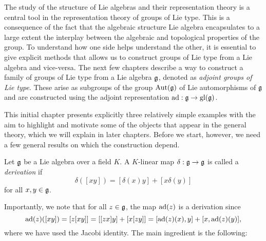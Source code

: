 The study of the structure of Lie algebras and their representation theory is a central tool in the representation theory of groups of Lie type. This is a consequence of the fact that the algebraic structure Lie algebra encapsulates to a large extent the interplay between the algebraic and topological properties of the group. To understand how one side helps understand the other, it is essential to give explicit methods that allows us to construct groups of Lie type from a Lie algebra and vice-versa. The next few chapters describe a way to construct a family of groups of Lie type from a Lie algebra $\mathfrak{g}$, denoted as \textit{adjoint groups of Lie type}. These arise as subgroups of the group $\mathrm{Aut}(\mathfrak{g})$ of Lie automorphisms of $\mathfrak{g}$ and are constructed using the adjoint representation $\mathrm{ad}:\mathfrak{g}\to\mathrm{gl}(\mathfrak{g})$.

This initial chapter presents explicitly three relatively simple examples with the aim to highlight and motivate some of the objects that appear in the general theory, which we will explain in later chapters. Before we start, however, we need a few general results on which the construction depend. 
\begin{definition}
    Let $\mathfrak{g}$ be a Lie algebra over a field $K$. A $K$-linear map $\delta:\mathfrak{g}\to\mathfrak{g}$ is called a \textit{derivation} if 
    $$\delta([xy])=[\delta(x)y]+[x\delta(y)]$$
    for all $x,y\in\mathfrak{g}$.
\end{definition}
Importantly, we note that for all $z\in\mathfrak{g}$, the map $\mathrm{ad}(z)$ is a derivation since $$\mathrm{ad}(z)([xy])=[z[xy]]=[[zx]y]+[x[zy]]=[\mathrm{ad}(z)(x),y]+[x,\mathrm{ad}(z)(y)],$$
where we have used the Jacobi identity. The main ingredient is the following:

